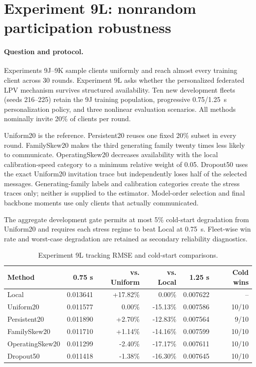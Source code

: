 \section{Experiment 9L: nonrandom participation robustness}
\label{sec:experiment9l}

\paragraph{Question and protocol.}
Experiments 9J--9K sample clients uniformly and reach almost every training
client across 30 rounds. Experiment 9L asks whether the personalized federated
LPV mechanism survives structured availability. Ten new development fleets
(seeds 216--225) retain the 9J training population, progressive 0.75/1.25~s
personalization policy, and three nonlinear evaluation scenarios. All methods
nominally invite 20\% of clients per round.

Uniform20 is the reference. Persistent20 reuses one fixed 20\% subset in every
round. FamilySkew20 makes the third generating family twenty times less likely
to communicate. OperatingSkew20 decreases availability with the local
calibration-speed category to a minimum relative weight of 0.05. Dropout50 uses
the exact Uniform20 invitation trace but independently loses half of the
selected messages. Generating-family labels and calibration categories create
the stress traces only; neither is supplied to the estimator. Model-order
selection and final backbone moments use only clients that actually
communicated.

The aggregate development gate permits at most 5\% cold-start degradation from
Uniform20 and requires each stress regime to beat Local at 0.75~s. Fleet-wise
win rate and worst-case degradation are retained as secondary reliability
diagnostics.

\begin{table}[htbp]
\centering
\caption{Experiment 9L tracking RMSE and cold-start comparisons.}
\label{tab:experiment9l-results}
\begin{tabular}{lrrrrr}
\toprule
Method & 0.75 s & vs. Uniform & vs. Local & 1.25 s & Cold wins\\
\midrule
Local           & 0.013641 & +17.82\% & 0.00\%   & 0.007622 & --\\
Uniform20       & 0.011577 & 0.00\%   & -15.13\% & 0.007586 & 10/10\\
Persistent20    & 0.011890 & +2.70\%  & -12.83\% & 0.007564 & 9/10\\
FamilySkew20    & 0.011710 & +1.14\%  & -14.16\% & 0.007599 & 10/10\\
OperatingSkew20 & 0.011299 & -2.40\%  & -17.17\% & 0.007611 & 10/10\\
Dropout50       & 0.011418 & -1.38\%  & -16.30\% & 0.007645 & 10/10\\
\bottomrule
\end{tabular}
\end{table}

